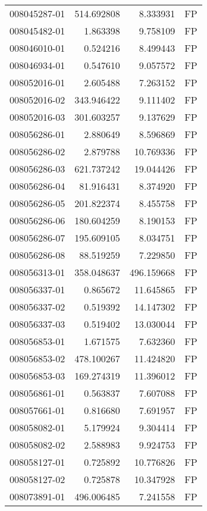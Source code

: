 \begin{tabular}{lrrl}
008045287-01 &  514.692808 &     8.333931 &   FP \\
008045482-01 &    1.863398 &     9.758109 &   FP \\
008046010-01 &    0.524216 &     8.499443 &   FP \\
008046934-01 &    0.547610 &     9.057572 &   FP \\
008052016-01 &    2.605488 &     7.263152 &   FP \\
008052016-02 &  343.946422 &     9.111402 &   FP \\
008052016-03 &  301.603257 &     9.137629 &   FP \\
008056286-01 &    2.880649 &     8.596869 &   FP \\
008056286-02 &    2.879788 &    10.769336 &   FP \\
008056286-03 &  621.737242 &    19.044426 &   FP \\
008056286-04 &   81.916431 &     8.374920 &   FP \\
008056286-05 &  201.822374 &     8.455758 &   FP \\
008056286-06 &  180.604259 &     8.190153 &   FP \\
008056286-07 &  195.609105 &     8.034751 &   FP \\
008056286-08 &   88.519259 &     7.229850 &   FP \\
008056313-01 &  358.048637 &   496.159668 &   FP \\
008056337-01 &    0.865672 &    11.645865 &   FP \\
008056337-02 &    0.519392 &    14.147302 &   FP \\
008056337-03 &    0.519402 &    13.030044 &   FP \\
008056853-01 &    1.671575 &     7.632360 &   FP \\
008056853-02 &  478.100267 &    11.424820 &   FP \\
008056853-03 &  169.274319 &    11.396012 &   FP \\
008056861-01 &    0.563837 &     7.607088 &   FP \\
008057661-01 &    0.816680 &     7.691957 &   FP \\
008058082-01 &    5.179924 &     9.304414 &   FP \\
008058082-02 &    2.588983 &     9.924753 &   FP \\
008058127-01 &    0.725892 &    10.776826 &   FP \\
008058127-02 &    0.725878 &    10.347928 &   FP \\
008073891-01 &  496.006485 &     7.241558 &   FP \\

\end{tabular}
